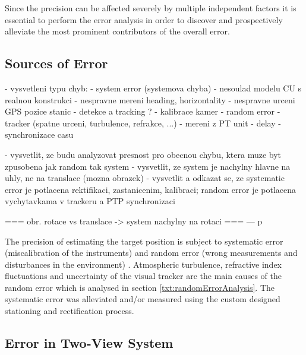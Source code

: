 Since the precision can be affected severely by multiple independent factors it is essential to perform the error analysis in order to discover and prospectively alleviate the most prominent contributors of the overall error.

\subsection{Sources of Error}

- vysvetleni typu chyb:
	- system error (systemova chyba)
		- nesoulad modelu CU s realnou konstrukci
		- nespravne mereni heading, horizontality
		- nespravne urceni GPS pozice stanic
		- detekce a tracking ?
		- kalibrace kamer
	- random error
		- tracker (spatne urceni, turbulence, refrakce, ...)
		- mereni z PT unit
		- delay
		- synchronizace casu

- vysvetlit, ze budu analyzovat presnost pro obecnou chybu, ktera muze byt zpusobena jak random tak system
- vysvetlit, ze system je nachylny hlavne na uhly, ne na translace (mozna obrazek)
- vysvetlit a odkazat se, ze systematic error je potlacena rektifikaci, zastanicenim, kalibraci; random error je potlacena vychytavkama v trackeru a PTP synchronizaci

=== obr. rotace vs translace -> system nachylny na rotaci ===
--- p

The precision of estimating the target position is subject to systematic error (miscalibration of the instruments) and random error (wrong measurements and disturbances in the environment) \cite{taylor1997introduction}. Atmospheric turbulence, refractive index fluctuations and uncertainty of the visual tracker are the main causes of the random error which is analysed in section \ref{txt:randomErrorAnalysis}. The systematic error was alleviated and/or measured using the custom designed stationing and rectification process.


\subsection{Error in Two-View System}

